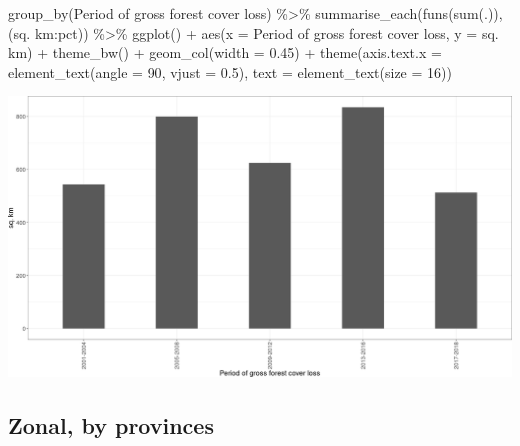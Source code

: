 \documentclass[10pt,landscape,a3paper]{article}
\newenvironment{Shaded}{\begin{snugshade}}{\end{snugshade}}
\newcommand{\AttributeTok}[1]{\textcolor[rgb]{0.77,0.63,0.00}{#1}}
\newcommand{\DecValTok}[1]{\textcolor[rgb]{0.00,0.00,0.81}{#1}}
\newcommand{\FloatTok}[1]{\textcolor[rgb]{0.00,0.00,0.81}{#1}}
\newcommand{\FunctionTok}[1]{\textcolor[rgb]{0.00,0.00,0.00}{#1}}
\newcommand{\NormalTok}[1]{#1}
\newcommand{\SpecialCharTok}[1]{\textcolor[rgb]{0.00,0.00,0.00}{#1}}
\newcommand{\StringTok}[1]{\textcolor[rgb]{0.31,0.60,0.02}{#1}}
\begin{document}
\begin{Shaded}
\begin{Highlighting}[]
  \FunctionTok{group\_by}\NormalTok{(}\StringTok{\textasciigrave{}}\AttributeTok{Period of gross forest cover loss}\StringTok{\textasciigrave{}}\NormalTok{) }\SpecialCharTok{\%\textgreater{}\%}
  \FunctionTok{summarise\_each}\NormalTok{(}\FunctionTok{funs}\NormalTok{(}\FunctionTok{sum}\NormalTok{(.)), (}\StringTok{\textasciigrave{}}\AttributeTok{sq. km}\StringTok{\textasciigrave{}}\SpecialCharTok{:}\NormalTok{pct)) }\SpecialCharTok{\%\textgreater{}\%} 
  \FunctionTok{ggplot}\NormalTok{() }\SpecialCharTok{+} \FunctionTok{aes}\NormalTok{(}\AttributeTok{x =} \StringTok{\textasciigrave{}}\AttributeTok{Period of gross forest cover loss}\StringTok{\textasciigrave{}}\NormalTok{, }\AttributeTok{y =} \StringTok{\textasciigrave{}}\AttributeTok{sq. km}\StringTok{\textasciigrave{}}\NormalTok{) }\SpecialCharTok{+}
  \FunctionTok{theme\_bw}\NormalTok{() }\SpecialCharTok{+} \FunctionTok{geom\_col}\NormalTok{(}\AttributeTok{width =} \FloatTok{0.45}\NormalTok{) }\SpecialCharTok{+}
  \FunctionTok{theme}\NormalTok{(}\AttributeTok{axis.text.x =} \FunctionTok{element\_text}\NormalTok{(}\AttributeTok{angle =} \DecValTok{90}\NormalTok{, }\AttributeTok{vjust =} \FloatTok{0.5}\NormalTok{), }\AttributeTok{text =} \FunctionTok{element\_text}\NormalTok{(}\AttributeTok{size =} \DecValTok{16}\NormalTok{))}
\end{Highlighting}
\end{Shaded}

\begin{center}\includegraphics[width=0.5\linewidth]{img/data-download-preparation-eda/year-of-gross-forest-cover-loss-nationwide-by-period-1} \end{center}

\hypertarget{zonal-by-provinces}{%
\subsection{Zonal, by provinces}\label{zonal-by-provinces}}
\end{document}
